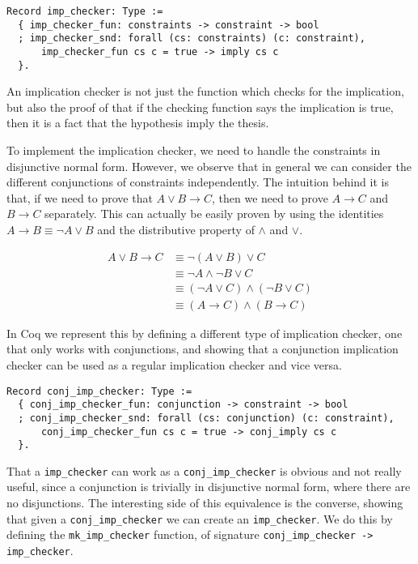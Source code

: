 \begin{verbatim}
Record imp_checker: Type := 
  { imp_checker_fun: constraints -> constraint -> bool
  ; imp_checker_snd: forall (cs: constraints) (c: constraint),
      imp_checker_fun cs c = true -> imply cs c
  }.
\end{verbatim}

An implication checker is not just the function which checks for the implication, but also the proof of
that if the checking function says the implication is true, then it is a fact that the hypothesis 
imply the thesis.

To implement the implication checker, we need to handle the constraints in disjunctive normal form. 
However, we observe that in general we can consider the different conjunctions of constraints 
independently. The intuition behind it is that, if we need to prove that $A \vee B \rightarrow C$, 
then we need to prove $A \rightarrow C$ and $B \rightarrow C$ separately. This can actually be easily 
proven by using the identities $A \rightarrow B \equiv \neg A \vee B$ and the distributive property of 
$\wedge$ and $\vee$.

\begin{align*}
A \vee B \rightarrow C &\equiv \neg (A \vee B) \vee C \\
                       &\equiv \neg A \wedge \neg B \vee C \\
                       &\equiv (\neg A \vee C)\wedge (\neg B \vee C) \\
                       &\equiv (A \rightarrow C)\wedge (B \rightarrow C)
\end{align*}


In Coq we represent this by defining a different type of implication checker, one that only works with 
conjunctions, and showing that a conjunction implication checker can be used as a regular implication
checker and vice versa.

\begin{verbatim}
Record conj_imp_checker: Type := 
  { conj_imp_checker_fun: conjunction -> constraint -> bool
  ; conj_imp_checker_snd: forall (cs: conjunction) (c: constraint),
      conj_imp_checker_fun cs c = true -> conj_imply cs c
  }.
\end{verbatim}

That a \texttt{imp_checker} can work as a \texttt{conj_imp_checker} is obvious and 
not really useful, since a conjunction is trivially in disjunctive normal form, where there are no 
disjunctions. The interesting side of this equivalence is the converse, showing that given a 
\texttt{conj_imp_checker} we can create an \texttt{imp_checker}. We do this by 
defining the \texttt{mk_imp_checker} function, of signature 
\texttt{conj_imp_checker -> imp_checker}.

